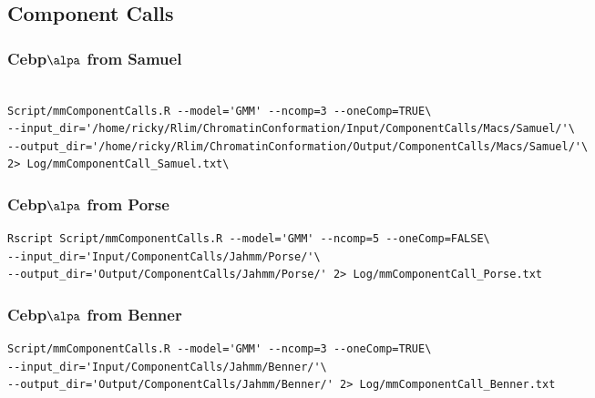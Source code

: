 \documentclass{article}\usepackage[]{graphicx}\usepackage[]{color}
\begin{document}
\subsection{Component Calls}


\subsubsection{Cebp$\alpa$ from Samuel}
\begin{verbatim}

Script/mmComponentCalls.R --model='GMM' --ncomp=3 --oneComp=TRUE\ 
--input_dir='/home/ricky/Rlim/ChromatinConformation/Input/ComponentCalls/Macs/Samuel/'\ 
--output_dir='/home/ricky/Rlim/ChromatinConformation/Output/ComponentCalls/Macs/Samuel/'\ 
2> Log/mmComponentCall_Samuel.txt\

\end{verbatim}

\subsubsection{Cebp$\alpa$ from Porse}
\begin{verbatim}
Rscript Script/mmComponentCalls.R --model='GMM' --ncomp=5 --oneComp=FALSE\ 
--input_dir='Input/ComponentCalls/Jahmm/Porse/'\
--output_dir='Output/ComponentCalls/Jahmm/Porse/' 2> Log/mmComponentCall_Porse.txt
\end{verbatim}

\subsubsection{Cebp$\alpa$ from Benner}
\begin{verbatim}
Script/mmComponentCalls.R --model='GMM' --ncomp=3 --oneComp=TRUE\ 
--input_dir='Input/ComponentCalls/Jahmm/Benner/'\ 
--output_dir='Output/ComponentCalls/Jahmm/Benner/' 2> Log/mmComponentCall_Benner.txt
\end{verbatim}
\end{document}
